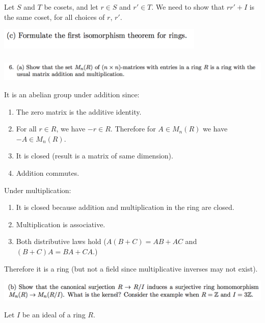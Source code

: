 Let $S$ and $T$ be cosets, and let $r \in S$ and $r' \in T$. We need to show that $rr' + I$ is the
same coset, for all choices of $r$, $r'$.

\newpage
\begin{mdframed}
  \includegraphics[width=280pt]{img/linear-algebra-a0-1-5-c.png}\\
\end{mdframed}

\newpage
\subsubsection{} %
\begin{mdframed}
  \includegraphics[width=400pt]{img/linear-algebra-a0-1-6-a.png}\\
\end{mdframed}
It is an abelian group under addition since:
\begin{enumerate}
\item The zero matrix is the additive identity.
\item For all $r \in R$, we have $-r \in R$. Therefore for $A \in M_n(R)$ we have $-A \in M_n(R)$.
\item It is closed (result is a matrix of same dimension).
\item Addition commutes.
\end{enumerate}

Under multiplication:
\begin{enumerate}
\item It is closed because addition and multiplication in the ring are closed.
\item Multiplication is associative.
\item Both distributive laws hold ($A(B + C) = AB + AC$ and $(B + C)A = BA + CA$.)
\end{enumerate}

Therefore it is a ring (but not a field since multiplicative inverses may not exist).

\begin{mdframed}
  \includegraphics[width=400pt]{img/linear-algebra-a0-1-6-b.png}\\
\end{mdframed}
Let $I$ be an ideal of a ring $R$.

